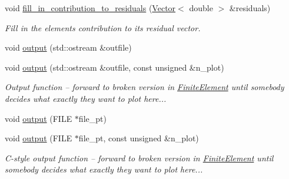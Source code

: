 \begin{DoxyCompactItemize}
void \hyperlink{classoomph_1_1ClampedSlidingHermiteBeamBoundaryConditionElement_ab6ff392e4c3d55d7a899ad4360ef8eb3}{fill\+\_\+in\+\_\+contribution\+\_\+to\+\_\+residuals} (\hyperlink{classoomph_1_1Vector}{Vector}$<$ double $>$ \&residuals)
\begin{DoxyCompactList}\small\item\em Fill in the element\textquotesingle{}s contribution to its residual vector. \end{DoxyCompactList}\item 
void \hyperlink{classoomph_1_1ClampedSlidingHermiteBeamBoundaryConditionElement_aa4399941fd93727cbb8a2bbb00355fb1}{output} (std\+::ostream \&outfile)
\item 
void \hyperlink{classoomph_1_1ClampedSlidingHermiteBeamBoundaryConditionElement_a7d6b2c570ba151ad86d136c070913d51}{output} (std\+::ostream \&outfile, const unsigned \&n\+\_\+plot)
\begin{DoxyCompactList}\small\item\em Output function -- forward to broken version in \hyperlink{classoomph_1_1FiniteElement}{Finite\+Element} until somebody decides what exactly they want to plot here... \end{DoxyCompactList}\item 
void \hyperlink{classoomph_1_1ClampedSlidingHermiteBeamBoundaryConditionElement_a820b232abacf508b9e8cbcad94f77755}{output} (F\+I\+LE $\ast$file\+\_\+pt)
\item 
void \hyperlink{classoomph_1_1ClampedSlidingHermiteBeamBoundaryConditionElement_a14464bc8c32618741eefea80493f5a8d}{output} (F\+I\+LE $\ast$file\+\_\+pt, const unsigned \&n\+\_\+plot)
\begin{DoxyCompactList}\small\item\em C-\/style output function -- forward to broken version in \hyperlink{classoomph_1_1FiniteElement}{Finite\+Element} until somebody decides what exactly they want to plot here... \end{DoxyCompactList}\end{DoxyCompactItemize}
